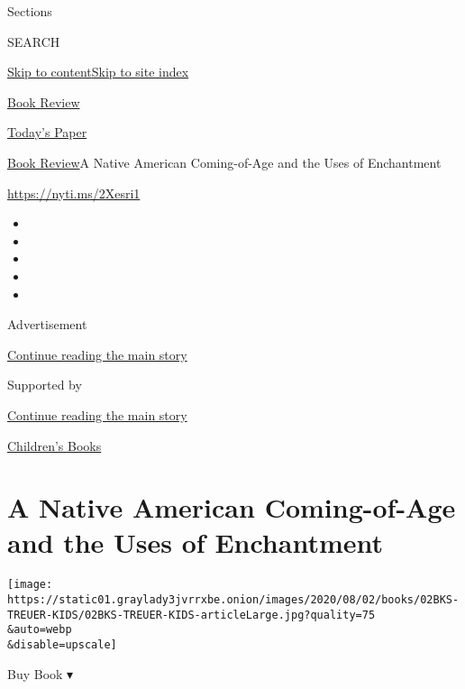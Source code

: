 Sections

SEARCH

\protect\hyperlink{site-content}{Skip to
content}\protect\hyperlink{site-index}{Skip to site index}

\href{https://www.nytimes3xbfgragh.onion/section/books/review}{Book
Review}

\href{https://myaccount.nytimes3xbfgragh.onion/auth/login?response_type=cookie\&client_id=vi}{}

\href{https://www.nytimes3xbfgragh.onion/section/todayspaper}{Today's
Paper}

\href{/section/books/review}{Book Review}\textbar{}A Native American
Coming-of-Age and the Uses of Enchantment

\url{https://nyti.ms/2Xesri1}

\begin{itemize}
\item
\item
\item
\item
\item
\end{itemize}

Advertisement

\protect\hyperlink{after-top}{Continue reading the main story}

Supported by

\protect\hyperlink{after-sponsor}{Continue reading the main story}

\href{/column/childrens-books}{Children's Books}

\hypertarget{a-native-american-coming-of-age-and-the-uses-of-enchantment}{%
\section{A Native American Coming-of-Age and the Uses of
Enchantment}\label{a-native-american-coming-of-age-and-the-uses-of-enchantment}}

\texttt{[image: https://static01.graylady3jvrrxbe.onion/images/2020/08/02/books/02BKS-TREUER-KIDS/02BKS-TREUER-KIDS-articleLarge.jpg?quality=75\\\&auto=webp\\\&disable=upscale]}

Buy Book ▾

